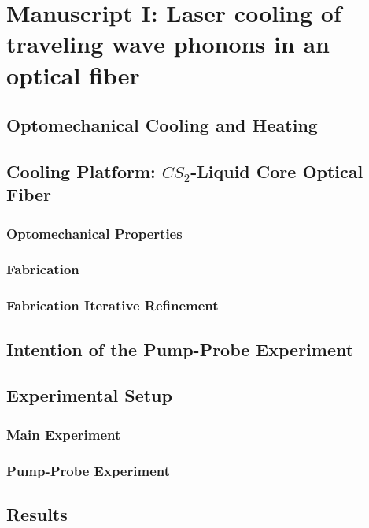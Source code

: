 \setcounter{rownumber}{0}
\singlespacing
\chapter{Manuscript I: Laser cooling of traveling wave phonons in an optical fiber}
\label{ch:Cooling}
\acresetall

\section{Optomechanical Cooling and Heating}

\section{Cooling Platform: $CS_{2}$-Liquid Core Optical Fiber}

  \subsection{Optomechanical Properties}

  \subsection{Fabrication}

  \subsection{Fabrication Iterative Refinement}

\section{Intention of the Pump-Probe Experiment}

\section{Experimental Setup}

  \subsection{Main Experiment}

  \subsection{Pump-Probe Experiment}

\section{Results}

